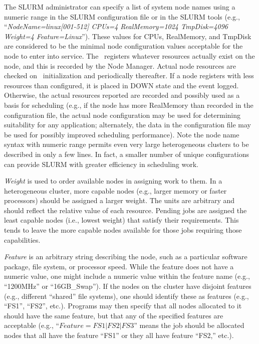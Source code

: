 \documentclass[10pt,onecolumn,times]{llncs}
\begin{document}
{The SLURM administrator can specify a list of system node names using
a numeric range in the SLURM configuration file or in the SLURM tools
(e.g., ``{\em NodeName=linux[001-512] CPUs=4 RealMemory=1024 TmpDisk=4096 \linebreak
Weight=4 Feature=Linux}'').  These values for CPUs, RealMemory, and
TmpDisk are considered to be the minimal node configuration values
acceptable for the node to enter into service.  The \slurmd\ registers
whatever resources actually exist on the node, and this is recorded
by the Node Manager.  Actual node resources are checked on \slurmd\
initialization and periodically thereafter.  If a node registers with
less resources than configured, it is placed in DOWN state and
the event logged.  Otherwise, the actual resources reported are recorded
and possibly used as a basis for scheduling (e.g., if the node has more
RealMemory than recorded in the configuration file, the actual node
configuration may be used for determining suitability for any application;
alternately, the data in the configuration file may be used for possibly
improved scheduling performance).  Note the node name syntax with numeric
range permits even very large heterogeneous clusters to be described in
only a few lines.  In fact, a smaller number of unique configurations
can provide SLURM with greater efficiency in scheduling work.

{\em Weight} is used to order available nodes in assigning work to
them.  In a heterogeneous cluster, more capable nodes (e.g., larger memory
or faster processors) should be assigned a larger weight.  The units
are arbitrary and should reflect the relative value of each resource.
Pending jobs are assigned the least capable nodes (i.e., lowest weight)
that satisfy their requirements.  This tends to leave the more capable
nodes available for those jobs requiring those capabilities.

{\em Feature} is an arbitrary string describing the node, such as a
particular software package, file system, or processor speed.  While the
feature does not have a numeric value, one might include a numeric value
within the feature name (e.g., ``1200MHz'' or ``16GB\_Swap'').  If the
nodes on the cluster have disjoint features (e.g., different ``shared''
file systems), one should identify these as features (e.g., ``FS1'',
``FS2'', etc.).  Programs may then specify that all nodes allocated to
it should have the same feature, but that any of the specified features
are acceptable (e.g., ``$Feature=FS1|FS2|FS3$'' means the job should be
allocated nodes that all have the feature ``FS1'' or they all have feature
``FS2,'' etc.).

}
\end{document}

